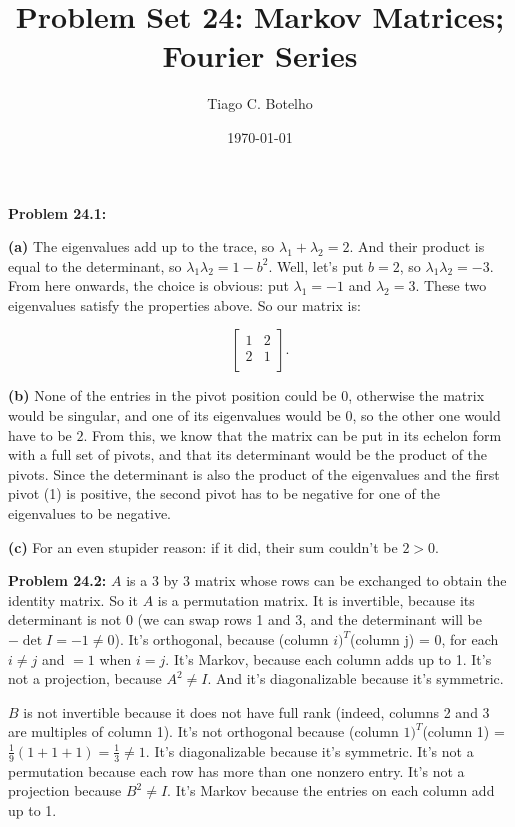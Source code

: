 \documentclass{article}
\title{Problem Set 24: Markov Matrices; Fourier Series}
\author{Tiago C. Botelho}
\date{\today}
\begin{document}
\maketitle

\noindent \textbf{Problem 24.1:}

\noindent \textbf{(a)} The eigenvalues add up to the trace, so $\lambda_1 + \lambda_2 = 2$. And their product is equal to the determinant, so $\lambda_1\lambda_2 = 1 - b^{2}$. Well, let's put $b = 2$, so $\lambda_1\lambda_2 = -3$. From here onwards, the choice is obvious: put $\lambda_1 = -1$ and $\lambda_2 = 3$. These two eigenvalues satisfy the properties above. So our matrix is:

\[
\begin{bmatrix}
1 & 2\\
2 & 1\\
\end{bmatrix}.
\]

\noindent \textbf{(b)} None of the entries in the pivot position could be 0, otherwise the matrix would be singular, and one of its eigenvalues would be $0$, so the other one would have to be $2$. From this, we know that the matrix can be put in its echelon form with a full set of pivots, and that its determinant would be the product of the pivots. Since the determinant is also the product of the eigenvalues and the first pivot (1) is positive, the second pivot has to be negative for one of the eigenvalues to be negative.

\noindent \textbf{(c)} For an even stupider reason: if it did, their sum couldn't be $2 > 0$.

\noindent \textbf{Problem 24.2:} $A$ is a 3 by 3 matrix whose rows can be exchanged to obtain the identity matrix. So it $A$ is a permutation matrix. It is invertible, because its determinant is not 0 (we can swap rows 1 and 3, and the determinant will be $-\det I = -1 \neq 0$). It's orthogonal, because (column $i)^{T}$(column j) = 0, for each $i \neq j$ and $= 1$ when $i = j$. It's Markov, because each column adds up to 1. It's not a projection, because $A^{2} \neq I$. And it's diagonalizable because it's symmetric.

$B$ is not invertible because it does not have full rank (indeed, columns 2 and 3 are multiples of column 1). It's not orthogonal because (column $1)^{T}$(column 1) = $\frac{1}{9}(1 + 1 + 1) = \frac{1}{3} \neq 1.$ It's diagonalizable because it's symmetric. It's not a permutation because each row has more than one nonzero entry. It's not a projection because $B^{2} \neq I$. It's Markov because the entries on each column add up to 1.
\end{document}
